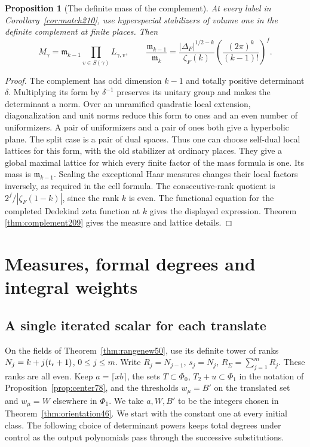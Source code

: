 \documentclass[a4paper,11pt]{article}
\newtheorem{proposition}{Proposition}[section]
\theoremstyle{definition}
\theoremstyle{remark}
\numberwithin{equation}{section}
\begin{document}
\begin{proposition}[The definite mass of the complement]
\label{prop:complement210}
At every label in Corollary~\ref{cor:match210}, use hyperspecial
stabilizers of volume one in the definite complement at finite places.
Then
\[
       M_\gamma=\mathfrak m_{k-1}\prod_{v\in S(\gamma)}L_{\gamma,v},
 \qquad
       \frac{\mathfrak m_{k-1}}{\mathfrak m_k}
       =\frac{|\Delta_F|^{1/2-k}}{\zeta_F(k)}
                   \left(\frac{(2\pi)^k}{(k-1)!}\right)^f .
\]
\end{proposition}
\begin{proof}
The complement has odd dimension \(k-1\) and totally positive
determinant \(\delta\). Multiplying its form by \(\delta^{-1}\)
preserves its unitary group and makes the determinant a norm.
Over an unramified quadratic local extension, diagonalization and
unit norms reduce this form to ones and an even number of
uniformizers. A pair of uniformizers and a pair of ones both
give a hyperbolic plane. The split case is a pair of dual spaces.
Thus one can choose self-dual local lattices for this form, with
the old stabilizer at ordinary places. They give a global maximal
lattice for which every finite factor of the mass formula is one.
Its mass is \(\mathfrak m_{k-1}\). Scaling the exceptional
Haar measures changes their local factors inversely, as required
in the cell formula. The consecutive-rank quotient is
\(2^f/|\zeta_F(1-k)|\), since the rank \(k\) is even. The
functional equation for the completed Dedekind zeta function
at \(k\) gives the displayed expression.
Theorem \ref{thm:complement209}
gives the measure and lattice details.
\end{proof}

\section{Measures, formal degrees and integral weights}\label{nav:g-VIII-2}

\subsection{A single iterated scalar for each translate}\label{nav:VI-18}
On the fields of Theorem~\ref{thm:rangenew50}, use its definite
tower of ranks \(N_j=k+j(t_{\rm r}+1)\), \(0\le j\le m\).
Write \(R_j=N_{j-1}\), \(s_j=N_j\), \(R_\Sigma=\sum_{j=1}^m R_j\).
These ranks are all even. Keep \(a=\lceil xb\rceil\), the sets
\(T\subset\Phi_0\), \(T_2+u\subset\Phi_1\) in the notation of
Proposition~\ref{prop:center78}, and the thresholds \(w_\mu=B'\)
on the translated set and \(w_\mu=W\) elsewhere in \(\Phi_1\).
We take \(a,W,B'\) to be the integers chosen in
Theorem~\ref{thm:orientation46}. We start with the constant one
at every initial class. The following choice of determinant powers
keeps total degrees under control as the output polynomials pass
through the successive substitutions.
\end{document}
